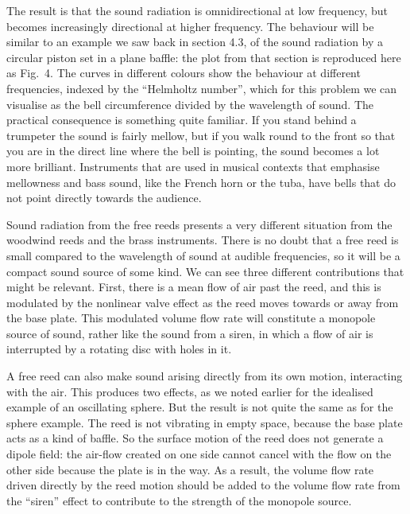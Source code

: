 
  The result is that the sound radiation is omnidirectional at low frequency, 
  but becomes increasingly directional at higher frequency. The behaviour will 
  be similar to an example we saw back in section 4.3, of the sound radiation 
  by a circular piston set in a plane baffle: the plot from that section is 
  reproduced here as Fig.\ 4. The curves in different colours show the 
  behaviour at different frequencies, indexed by the “Helmholtz number”, which 
  for this problem we can visualise as the bell circumference divided by the 
  wavelength of sound. The practical consequence is something quite familiar. 
  If you stand behind a trumpeter the sound is fairly mellow, but if you walk 
  round to the front so that you are in the direct line where the bell is 
  pointing, the sound becomes a lot more brilliant. Instruments that are used 
  in musical contexts that emphasise mellowness and bass sound, like the French 
  horn or the tuba, have bells that do not point directly towards the audience. 


  Sound radiation from the free reeds presents a very different situation from 
  the woodwind reeds and the brass instruments. There is no doubt that a free 
  reed is small compared to the wavelength of sound at audible frequencies, so 
  it will be a compact sound source of some kind. We can see three different 
  contributions that might be relevant. First, there is a mean flow of air past 
  the reed, and this is modulated by the nonlinear valve effect as the reed 
  moves towards or away from the base plate. This modulated volume flow rate 
  will constitute a monopole source of sound, rather like the sound from a 
  siren, in which a flow of air is interrupted by a rotating disc with holes in 
  it. 

  A free reed can also make sound arising directly from its own motion, 
  interacting with the air. This produces two effects, as we noted earlier for 
  the idealised example of an oscillating sphere. But the result is not quite 
  the same as for the sphere example. The reed is not vibrating in empty space, 
  because the base plate acts as a kind of baffle. So the surface motion of the 
  reed does not generate a dipole field: the air-flow created on one side 
  cannot cancel with the flow on the other side because the plate is in the 
  way. As a result, the volume flow rate driven directly by the reed motion 
  should be added to the volume flow rate from the “siren” effect to contribute 
  to the strength of the monopole source. 

